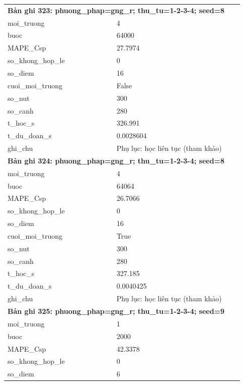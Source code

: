 \begin{longtable}{p{0.43\linewidth}p{0.50\linewidth}}
\midrule
\multicolumn{2}{p{0.95\linewidth}}{\textbf{Bản ghi 323: phuong\_phap=gng\_r; thu\_tu=1-2-3-4; seed=8}} \\
moi\_\allowbreak truong & 4 \\
buoc & 64000 \\
MAPE\_\allowbreak Csp & 27.7974 \\
so\_\allowbreak khong\_\allowbreak hop\_\allowbreak le & 0 \\
so\_\allowbreak diem & 16 \\
cuoi\_\allowbreak moi\_\allowbreak truong & False \\
so\_\allowbreak nut & 300 \\
so\_\allowbreak canh & 280 \\
t\_\allowbreak hoc\_\allowbreak s & 326.991 \\
t\_\allowbreak du\_\allowbreak doan\_\allowbreak s & 0.0028604 \\
ghi\_\allowbreak chu & Phụ lục: học liên tục (tham khảo) \\
\midrule
\multicolumn{2}{p{0.95\linewidth}}{\textbf{Bản ghi 324: phuong\_phap=gng\_r; thu\_tu=1-2-3-4; seed=8}} \\
moi\_\allowbreak truong & 4 \\
buoc & 64064 \\
MAPE\_\allowbreak Csp & 26.7066 \\
so\_\allowbreak khong\_\allowbreak hop\_\allowbreak le & 0 \\
so\_\allowbreak diem & 16 \\
cuoi\_\allowbreak moi\_\allowbreak truong & True \\
so\_\allowbreak nut & 300 \\
so\_\allowbreak canh & 280 \\
t\_\allowbreak hoc\_\allowbreak s & 327.185 \\
t\_\allowbreak du\_\allowbreak doan\_\allowbreak s & 0.0040425 \\
ghi\_\allowbreak chu & Phụ lục: học liên tục (tham khảo) \\
\midrule
\multicolumn{2}{p{0.95\linewidth}}{\textbf{Bản ghi 325: phuong\_phap=gng\_r; thu\_tu=1-2-3-4; seed=9}} \\
moi\_\allowbreak truong & 1 \\
buoc & 2000 \\
MAPE\_\allowbreak Csp & 42.3378 \\
so\_\allowbreak khong\_\allowbreak hop\_\allowbreak le & 0 \\
so\_\allowbreak diem & 6 \\

\end{longtable}
